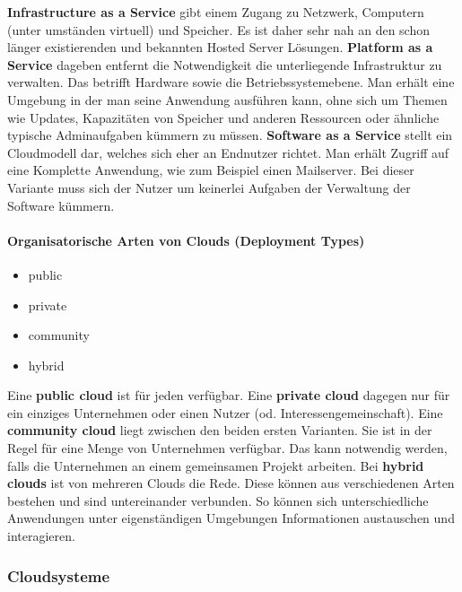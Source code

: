 \documentclass[a4paper,10pt]{article}
\numberwithin{figure}{section}
\numberwithin{table}{section}
\begin{document}
\textbf{Infrastructure as a Service} gibt einem Zugang zu Netzwerk, Computern (unter umständen virtuell) und Speicher.
Es ist daher sehr nah an den schon länger existierenden und bekannten Hosted Server Lösungen. 
\textbf{Platform as a Service} dageben entfernt die Notwendigkeit die unterliegende Infrastruktur zu verwalten.
Das betrifft Hardware sowie die Betriebssystemebene.
Man erhält eine Umgebung in der man seine Anwendung ausführen kann, ohne sich um Themen wie Updates, Kapazitäten von Speicher und anderen Ressourcen oder ähnliche typische Adminaufgaben kümmern zu müssen.
\textbf{Software as a Service} stellt ein Cloudmodell dar, welches sich eher an Endnutzer richtet.
Man erhält Zugriff auf eine Komplette Anwendung, wie zum Beispiel einen Mailserver.
Bei dieser Variante muss sich der Nutzer um keinerlei Aufgaben der Verwaltung der Software kümmern.

\paragraph{Organisatorische Arten von Clouds (Deployment Types)}

\begin{itemize}
 \item public
 \item private
 \item community
 \item hybrid
\end{itemize}

Eine \textbf{public cloud} ist für jeden verfügbar.
Eine \textbf{private cloud} dagegen nur für ein einziges Unternehmen oder einen Nutzer (od. Interessengemeinschaft).
Eine \textbf{community cloud} liegt zwischen den beiden ersten Varianten.
Sie ist in der Regel für eine Menge von Unternehmen verfügbar.
Das kann notwendig werden, falls die Unternehmen an einem gemeinsamen Projekt arbeiten.
Bei \textbf{hybrid clouds} ist von mehreren Clouds die Rede.
Diese können aus verschiedenen Arten bestehen und sind untereinander verbunden.
So können sich unterschiedliche Anwendungen unter eigenständigen Umgebungen Informationen austauschen und interagieren.

\subsubsection{Cloudsysteme}

\end{document}
